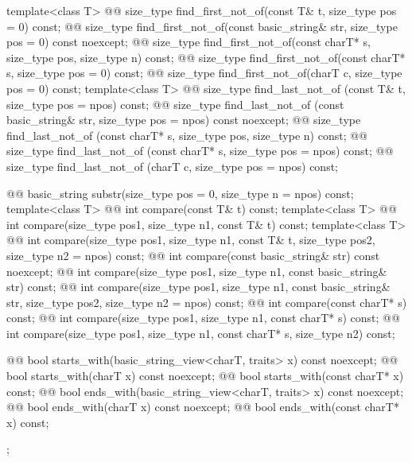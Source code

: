 \documentclass{wg21}
\begin{document}
\begin{codeblock}
{{    template<class T>
      @@
      size_type find_first_not_of(const T& t, size_type pos = 0) const;
    @@ size_type
    find_first_not_of(const basic_string& str, size_type pos = 0) const noexcept;
    @@ size_type
    find_first_not_of(const charT* s, size_type pos, size_type n) const;
    @@ size_type
    find_first_not_of(const charT* s, size_type pos = 0) const;
    @@ size_type
    find_first_not_of(charT c, size_type pos = 0) const;
    template<class T>
      @@
      size_type find_last_not_of (const T& t, size_type pos = npos) const;
    @@
    size_type find_last_not_of (const basic_string& str, size_type pos = npos) const noexcept;
    @@
    size_type find_last_not_of (const charT* s, size_type pos, size_type n) const;
    @@
    size_type find_last_not_of (const charT* s, size_type pos = npos) const;
    @@
    size_type find_last_not_of (charT c, size_type pos = npos) const;

    @@ basic_string substr(size_type pos = 0, size_type n = npos) const;
    template<class T>
      @@ int compare(const T& t) const;
    template<class T>
      @@ int compare(size_type pos1, size_type n1, const T& t) const;
    template<class T>
      @@ int compare(size_type pos1, size_type n1, const T& t,
                                      size_type pos2, size_type n2 = npos) const;
    @@ int compare(const basic_string& str) const noexcept;
    @@ int compare(size_type pos1, size_type n1, const basic_string& str) const;
    @@ int compare(size_type pos1, size_type n1, const basic_string& str,
                                    size_type pos2, size_type n2 = npos) const;
    @@ int compare(const charT* s) const;
    @@ int compare(size_type pos1, size_type n1, const charT* s) const;
    @@ int compare(size_type pos1, size_type n1, const charT* s, size_type n2) const;

    @@ bool starts_with(basic_string_view<charT, traits> x) const noexcept;
    @@ bool starts_with(charT x) const noexcept;
    @@ bool starts_with(const charT* x) const;
    @@ bool ends_with(basic_string_view<charT, traits> x) const noexcept;
    @@ bool ends_with(charT x) const noexcept;
    @@ bool ends_with(const charT* x) const;
  };

}
\end{codeblock}
\end{document}

